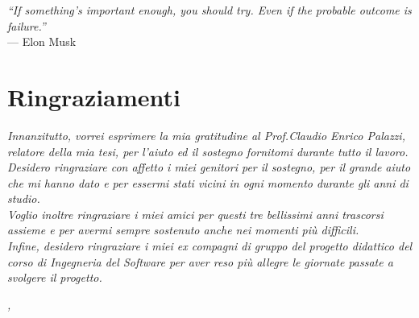 
\cleardoublepage
{}
{}

\begin{flushright}{
	\slshape    
	``If something's important enough, you should try. Even if the probable outcome is failure.''} \\ 
	\medskip
   	--- Elon Musk %
\end{flushright}


\bigskip

\begingroup
\let\clearpage\relax
\let\cleardoublepage\relax
\let\cleardoublepage\relax

\chapter*{Ringraziamenti}

\noindent \textit{Innanzitutto, vorrei esprimere la mia gratitudine al Prof.Claudio Enrico Palazzi, relatore della mia tesi, per l'aiuto ed il sostegno fornitomi durante tutto il lavoro.}\\

\noindent \textit{Desidero ringraziare con affetto i miei genitori per il sostegno, per il grande aiuto che mi hanno dato e per essermi stati vicini in ogni momento durante gli anni di studio.}\\

\noindent \textit{Voglio inoltre ringraziare i miei amici per questi tre bellissimi anni trascorsi assieme e per avermi sempre sostenuto anche nei momenti più difficili.}\\

\noindent \textit{Infine, desidero ringraziare i miei ex compagni di gruppo del progetto didattico del corso di Ingegneria del Software per aver reso più allegre le giornate passate a svolgere il progetto.}
\bigskip

\noindent\textit{\myLocation, \myTime}
\hfill \myName

\endgroup

